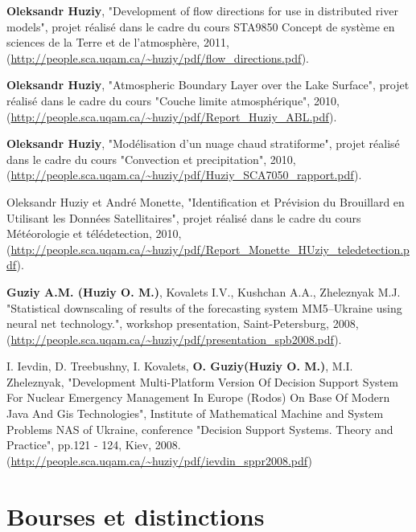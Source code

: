\documentclass[letterpaper]{article}
\renewenvironment{itemize}{
  \begin{list}{}{
    \setlength{\leftmargin}{1.5em}
  }
}{
  \end{list}
}
\begin{document}
\begin{itemize}
    \item \textbf{Oleksandr Huziy}, "Development of flow directions for use in
    distributed river models", projet réalisé dans le cadre du cours STA9850
    Concept de système en sciences de la Terre et de l'atmosphère, 2011,
    (\url{http://people.sca.uqam.ca/~huziy/pdf/flow_directions.pdf}).
   
    \item \textbf{Oleksandr Huziy}, "Atmospheric Boundary Layer over the Lake Surface",
           projet réalisé dans le cadre du cours "Couche limite atmosphérique",
           2010, (\url{http://people.sca.uqam.ca/~huziy/pdf/Report_Huziy_ABL.pdf}).
   
    \item \textbf{Oleksandr Huziy}, "Modélisation d’un nuage chaud stratiforme",
       projet réalisé dans le cadre du cours "Convection et precipitation", 2010,
       (\url{http://people.sca.uqam.ca/~huziy/pdf/Huziy_SCA7050_rapport.pdf}).

    \item Oleksandr Huziy et André Monette, "Identification et Prévision du
    Brouillard en Utilisant les Données Satellitaires", projet réalisé dans le cadre du cours Météorologie et télédetection,
       2010, (\url{http://people.sca.uqam.ca/~huziy/pdf/Report_Monette_HUziy_teledetection.pdf}).

    \item \textbf{Guziy A.M. (Huziy O. M.)}, Kovalets I.V., Kushchan A.A.,
    Zheleznyak M.J.
    "Statistical downscaling of results of the forecasting system MM5–Ukraine using neural net technology.",
    workshop presentation, Saint-Petersburg, 2008, (\url{http://people.sca.uqam.ca/~huziy/pdf/presentation_spb2008.pdf}).

    \item I. Ievdin, D. Treebushny, I. Kovalets, \textbf{O. Guziy(Huziy O. M.)}, M.I.
    Zheleznyak, "Development Multi-Platform Version Of Decision Support System For Nuclear Emergency Management In Europe (Rodos)
    On Base Of Modern Java And Gis Technologies", 
    Institute of Mathematical Machine and System Problems NAS of Ukraine, conference
    "Decision Support Systems. Theory and Practice", pp.121 - 124, Kiev, 2008.
     (\url{http://people.sca.uqam.ca/~huziy/pdf/ievdin_sppr2008.pdf})

\end{itemize}


\section*{Bourses et distinctions}
\end{document}
